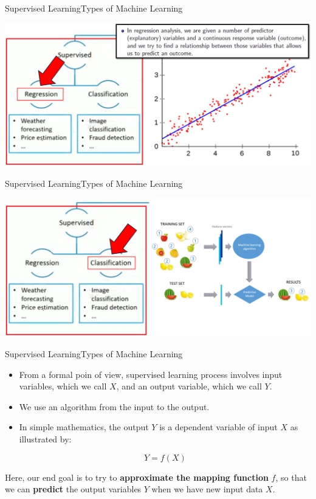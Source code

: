 \documentclass[11pt]{beamer}
\newcommand{\hly}[1]{\colorbox{yellow!100}{#1}}
\begin{document}
\begin{frame}{Supervised Learning}{Types of Machine Learning}
	\begin{center}
	\includegraphics[scale=0.38]{../05-pictures/lesson-1-1_pic_20.png}
	\end{center}
\end{frame}
\begin{frame}{Supervised Learning}{Types of Machine Learning}
	\begin{center}
	\includegraphics[scale=0.38]{../05-pictures/lesson-1-1_pic_21.png}
	\end{center}
\end{frame}
\begin{frame}{Supervised Learning}{Types of Machine Learning }
\begin{itemize}
\item From a formal poin of view, supervised learning process involves input variables, which we call $X$, and an output variable, which we call $Y$. 

\item We use an algorithm \hly{} from the input to the output. 

\item In simple mathematics, the output $Y$ is a dependent variable of input $X$ as illustrated by:

$$Y = f(X)$$
\end{itemize}

\begin{tcolorbox}
Here, our end goal is to try to \textbf{approximate the mapping function} $f$, so that we can \textbf{predict} the output variables $Y$ when we have new input data $X$.
\end{tcolorbox}
\end{frame}
\end{document}
